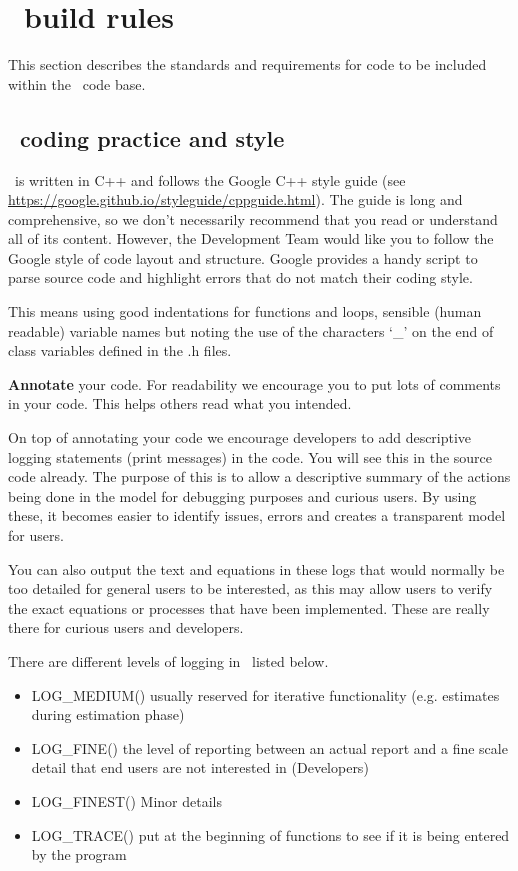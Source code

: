 \section{\CNAME\ build rules\label{sec:build_rules}}

This section describes the standards and requirements for code to be included within the \CNAME\ code base. 

\subsection{\CNAME\ coding practice and style}\label{subsec:code_practive}

\CNAME\ is written in C++ and follows the Google C++ style guide (see \url{https://google.github.io/styleguide/cppguide.html}). The guide is long and comprehensive, so we don't necessarily recommend that you read or understand all of its content. However, the Development Team would like you to follow the Google style of code layout and structure. Google provides a handy script to parse source code and highlight errors that do not match their coding style.

This means using good indentations for functions and loops, sensible (human readable) variable names but noting the use of the characters `\_' on the end of class variables defined in the .h files. 

\textbf{Annotate} your code. For readability we encourage you to put lots of comments in your code. This helps others read what you intended. 

On top of annotating your code we encourage developers to add descriptive logging statements (print messages) in the code. You will see this in the source code already. The purpose of this is to allow a descriptive summary of the actions being done in the model for debugging purposes and curious users. By using these, it becomes easier to identify issues, errors and creates a transparent model for users.

You can also output the text and equations in these logs that would normally be too detailed for general users to be interested, as this may allow users to verify the exact equations or processes that have been implemented. These are really there for curious users and developers.

There are different levels of logging in \CNAME\ listed below.
\begin{itemize}
	\item LOG\_MEDIUM()  usually reserved for iterative functionality (e.g. estimates during estimation phase)
	\item LOG\_FINE() the level of reporting between an actual report and a fine scale detail that end users are not interested in (Developers)
	\item LOG\_FINEST() Minor details
	\item LOG\_TRACE() put at the beginning of functions to see if it is being entered by the program
\end{itemize}


